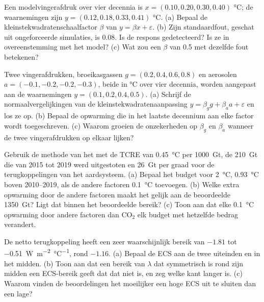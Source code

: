 \begin{exercise}[$\star\star$]\label{exo:b2:anthropogenic-climate-change:9}
Een modelvingerafdruk over vier decennia is $x = (0.10, 0.20, 0.30, 0.40)$ \unit{\celsius}; de
waarnemingen zijn $y = (0.12, 0.18, 0.33, 0.41)$ \unit{\celsius}. (a) Bepaal de
kleinstekwadratenschaalfactor $\beta$ van $y = \beta x + \varepsilon$. (b) Zijn standaardfout, geschat uit ongeforceerde
simulaties, is \num{0.08}. Is de respons gedetecteerd? Is ze in overeenstemming met het model? (c) Wat
zou een $\beta$ van 0.5 met dezelfde fout betekenen?
\end{exercise}

\begin{exercise}[$\star\star\star$]\label{exo:b2:anthropogenic-climate-change:10}
Twee vingerafdrukken, broeikasgassen $g = (0.2, 0.4, 0.6, 0.8)$ en aerosolen $a = (-0.1, -0.2,
-0.2, -0.3)$, beide in \unit{\celsius} over vier decennia, worden aangepast aan de waarnemingen $y = (0.1,
0.2, 0.4, 0.5)$. (a) Schrijf de normaalvergelijkingen van de kleinstekwadratenaanpassing $y = \beta_g g + \beta_a a
+ \varepsilon$ en los ze op. (b) Bepaal de opwarming die in het laatste decennium aan elke factor wordt toegeschreven.
(c) Waarom groeien de onzekerheden op $\beta_g$ en $\beta_a$ wanneer de twee vingerafdrukken op elkaar lijken?
\end{exercise}

\begin{exercise}[$\star\star\star$]\label{exo:b2:anthropogenic-climate-change:11}
Gebruik de methode van het  met de TCRE van \qty{0.45}{\celsius} per
\qty{1000}{Gt}, de \qty{210}{Gt} die van 2015 tot 2019 werd uitgestoten en \qty{26}{Gt} per graad voor de
terugkoppelingen van het aardsysteem. (a) Bepaal het budget voor \qty{2}{\celsius}, \qty{0.93}{\celsius} boven
2010--2019, als de andere factoren \qty{0.1}{\celsius} toevoegen. (b) Welke extra opwarming door de andere
factoren maakt het gelijk aan de beoordeelde \qty{1350}{Gt}? Ligt dat binnen het beoordeelde bereik? (c) Toon aan
dat elke \qty{0.1}{\celsius} opwarming door andere factoren dan CO$_2$ elk budget met hetzelfde bedrag verandert.
\end{exercise}

\begin{exercise}[$\star\star\star$]\label{exo:b2:anthropogenic-climate-change:12}
De netto terugkoppeling heeft een zeer waarschijnlijk bereik van $-1.81$ tot \qty{-0.51}{W.m^{-2}.\celsius^{-1}}, rond
$-1.16$. (a) Bepaal de ECS aan de twee uiteinden en in het midden. (b) Toon aan dat een bereik van $\lambda$
dat symmetrisch is rond zijn midden een ECS-bereik geeft dat dat niet is, en zeg welke kant langer is. (c) Waarom
vinden de beoordelingen het moeilijker een hoge ECS uit te sluiten dan een lage?
\end{exercise}

